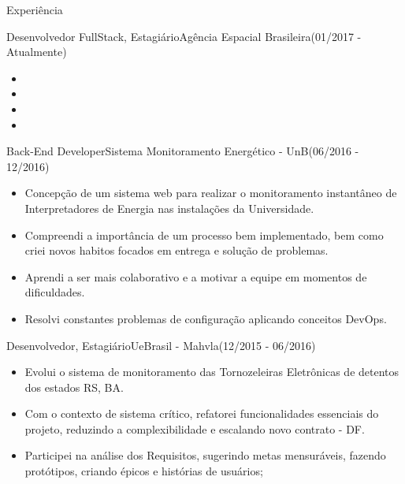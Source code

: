 \documentclass[]{fraguilarcv}
\begin{document}
	\makeheader

	\begin{cvsection}{Experiência}
		\begin{cvsubsection}{Desenvolvedor FullStack, Estagiário}{Agência Espacial Brasileira}{(01/2017 - Atualmente)}
			\begin{itemize}
              \item
              \item
              \item
              \item
			\end{itemize}
		\end{cvsubsection}

		\begin{cvsubsection}{Back-End Developer}{Sistema Monitoramento Energético - UnB}{(06/2016 - 12/2016)}
			\begin{itemize}
              \item Concepção de um sistema web para realizar o monitoramento instantâneo de Interpretadores de Energia nas instalações da Universidade.
              \item Compreendi a importância de um processo bem implementado, bem como criei novos habitos focados em entrega e solução de problemas.
              \item Aprendi a ser mais colaborativo e a motivar a equipe em momentos de dificuldades.
              \item Resolvi constantes problemas de configuração aplicando conceitos DevOps.
			\end{itemize}
		\end{cvsubsection}

		\begin{cvsubsection}{Desenvolvedor, Estagiário}{UeBrasil - Mahvla}{(12/2015 - 06/2016)}
			\begin{itemize}
				\item Evolui o sistema de monitoramento das Tornozeleiras Eletrônicas de detentos dos estados RS, BA.
	      		\item Com o contexto de sistema crítico, refatorei funcionalidades essenciais do projeto, reduzindo a complexibilidade e escalando novo contrato - DF.
	      		\item Participei na análise dos Requisitos, sugerindo metas mensuráveis, fazendo protótipos, criando épicos e histórias de usuários;
			\end{itemize}
		\end{cvsubsection}


\end{cvsection}
\end{document}
